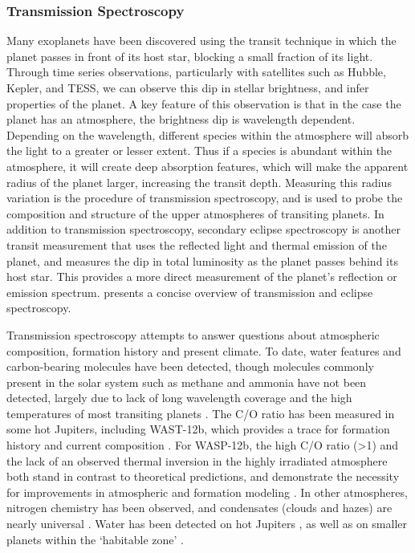 \subsubsection{Transmission Spectroscopy}
Many exoplanets have been discovered using the transit technique in which the planet passes in front of its host star, blocking a small fraction of its light.
Through time series observations, particularly with satellites such as Hubble, Kepler, and TESS, we can observe this dip in stellar brightness, and infer properties of the planet.
A key feature of this observation is that in the case the planet has an atmosphere, the brightness dip is wavelength dependent.
Depending on the wavelength, different species within the atmosphere will absorb the light to a greater or lesser extent.
Thus if a species is abundant within the atmosphere, it will create deep absorption features, which will make the apparent radius of the planet larger, increasing the transit depth.
Measuring this radius variation is the procedure of transmission spectroscopy, and is used to probe the composition and structure of the upper atmospheres of transiting planets.
In addition to transmission spectroscopy, secondary eclipse spectroscopy is another transit measurement that uses the reflected light and thermal emission of the planet, and measures the dip in total luminosity as the planet passes behind its host star.
This provides a more direct measurement of the planet's reflection or emission spectrum.
\parencite{Kreidberg2018} presents a concise overview of transmission and eclipse spectroscopy.

Transmission spectroscopy attempts to answer questions about atmospheric composition, formation history and present climate.
To date, water features and carbon-bearing molecules have been detected, though molecules commonly present in the solar system such as methane and ammonia have not been detected, largely due to lack of long wavelength coverage and the high temperatures of most transiting planets \parencite{Lee2012,Kreidberg2018}.
The C/O ratio has been measured in some hot Jupiters, including WAST-12b, which provides a trace for formation history and current composition \parencite{Madhusudhan2011}. 
For WASP-12b, the high C/O ratio (>1) and the lack of an observed thermal inversion in the highly irradiated atmosphere both stand in contrast to theoretical predictions, and demonstrate the necessity for improvements in atmospheric and formation modeling \parencite{Madhusudhan2011}.
In other atmospheres, nitrogen chemistry has been observed, and condensates (clouds and hazes) are nearly universal \parencite{MacDonald2017}.
Water has been detected on hot Jupiters \parencite{Kreidberg2014}, as well as on smaller planets within the `habitable zone' \parencite{Benneke2019,Tsiaras2019}.


